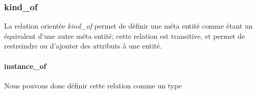 \documentclass[french,a4paper,titlepage]{article}
\begin{document}
			\subsubsection{kind\_of}
			
				La relation orientée \emph{kind\_of} permet de définir une méta entité comme étant un équivalent d'une autre méta entité; cette relation est transitive, et permet de restreindre ou d'ajouter des attributs à une entité.
				
				\paragraph{instance\_of} Nous pouvons donc définir cette relation comme un type
		
		
	
	
	
	
\end{document}
